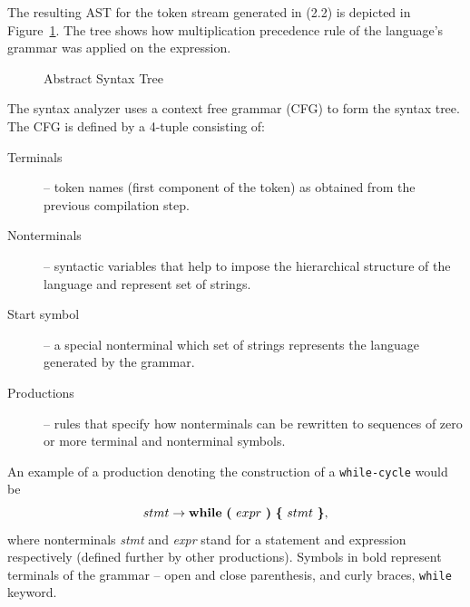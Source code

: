 \documentclass[
  digital, %
  table,   %
  lof,     %
  lot,     %
  oneside,
]{fithesis3}
\begin{document}
The resulting AST for the token stream generated in (2.2) is depicted in Figure~\ref{fig:compilers-abstract-syntax-tree}. The tree shows how multiplication precedence rule of the language's grammar was applied on the expression.

\begin{figure}
  \centering
  \caption{Abstract Syntax Tree}
  \label{fig:compilers-abstract-syntax-tree}
\end{figure}

The syntax analyzer uses a context free grammar (CFG) to form the syntax tree. The CFG is defined by a 4-tuple consisting of:
\begin{description}
  \item[Terminals] -- token names (first component of the token) as obtained from the previous compilation step.
  \item[Nonterminals] -- syntactic variables that help to impose the hierarchical structure of the language and represent set of strings.
  \item[Start symbol] -- a special nonterminal which set of strings represents the language generated by the grammar.
  \item[Productions] -- rules that specify how nonterminals can be rewritten to sequences of zero or more terminal and nonterminal symbols. 
\end{description}

An example of a production denoting the construction of a \texttt{while-cycle} would be
\begin{equation}
  stmt 
  \rightarrow 
  \textbf{while}\ 
  \textbf{(}\ expr\ \textbf{)}\ 
  \textbf{\{}\ stmt\ \textbf{\}} 
  \textnormal{,}
\end{equation}
\noindent
where nonterminals \textit{stmt} and \textit{expr} stand for a statement and expression respectively (defined further by other productions). Symbols in bold represent terminals of the grammar -- open and close parenthesis, and curly braces, \texttt{while} keyword.
\end{document}
